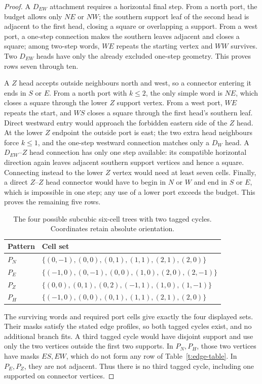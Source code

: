 \begin{proof}
A \(D_{EW}\) attachment requires a horizontal final step. From a north
port, the budget allows only \(NE\) or \(NW\); the southern support
leaf of the second head is adjacent to the first head, closing a
square or overlapping a support. From a west port, a one-step
connection makes the southern leaves adjacent and closes a square;
among two-step words, \(WE\) repeats the starting vertex and \(WW\)
survives. Two \(D_{EW}\) heads have only the already excluded one-step
geometry. This proves rows seven through ten.

A \(Z\) head accepts outside neighbours north and west, so a connector
entering it ends in \(S\) or \(E\). From a north port with \(k\le2\),
the only simple word is \(NE\), which closes a square through the
lower \(Z\) support vertex. From a west port, \(WE\) repeats the start,
and \(WS\) closes a square through the first head's southern leaf.
Direct westward entry would approach the forbidden eastern side of
the \(Z\) head. At the lower \(Z\) endpoint the outside port is east;
the two extra head neighbours force \(k\le1\), and the one-step
westward connection matches only a \(D_W\) head. A \(D_{EW}\)--\(Z\)
head connection has only one step available: its compatible horizontal
direction again leaves adjacent southern support vertices and hence
a square. Connecting instead to the lower \(Z\) vertex would need
at least seven cells. Finally, a direct \(Z\)--\(Z\) head connector
would have to begin in \(N\) or \(W\) and end in \(S\) or \(E\), which
is impossible in one step; any use of a lower port exceeds the
budget. This proves the remaining five rows.

\begin{table}[!htbp]
\centering
\small
\begin{tabular}{@{}ll@{}}
\toprule
Pattern & Cell set\\
\midrule
\(P_N\) & \(\{(0,-1),(0,0),(0,1),(1,1),(2,1),(2,0)\}\)\\
\(P_E\) & \(\{(-1,0),(0,-1),(0,0),(1,0),(2,0),(2,-1)\}\)\\
\(P_Z\) & \(\{(0,0),(0,1),(0,2),(-1,1),(1,0),(1,-1)\}\)\\
\(P_H\) & \(\{(-1,0),(0,0),(0,1),(1,1),(2,1),(2,0)\}\)\\
\bottomrule
\end{tabular}
\caption{The four possible subcubic six-cell trees with two tagged
cycles. Coordinates retain absolute orientation.}\label{t:pattern-coordinates}
\end{table}

The surviving words and required port cells give exactly the four
displayed sets. Their masks satisfy the stated edge profiles, so
both tagged cycles exist, and no additional branch fits. A third tagged cycle
would have disjoint support and use only the two vertices outside
the first two supports. In \(P_N,P_H\), those two vertices have
masks \(ES,EW\), which do not form any row of Table~\ref{t:edge-table}.
In \(P_E,P_Z\), they are not adjacent. Thus there is no third tagged
cycle, including one supported on connector vertices.
\end{proof}

